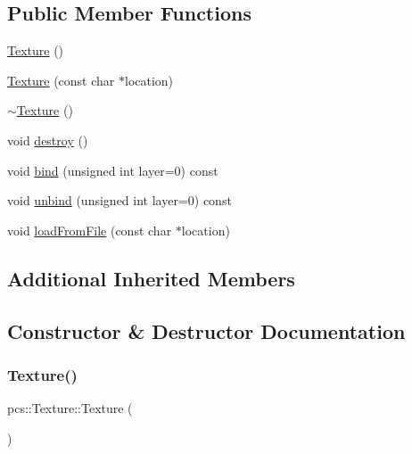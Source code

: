 \subsection*{Public Member Functions}
\begin{DoxyCompactItemize}
\item 
\hyperlink{classpcs_1_1Texture_a1f0e7c4ed23cf395b082cc5cc56497a4}{Texture} ()
\item 
\hyperlink{classpcs_1_1Texture_a7d85ec721e688ee7313bd858477fbcf2}{Texture} (const char $\ast$location)
\item 
\hyperlink{classpcs_1_1Texture_a2267bb7d920e784a1915ae14e5b5916b}{$\sim$\+Texture} ()
\item 
void \hyperlink{classpcs_1_1Texture_aad31d75ae69be153300bd87e244afa54}{destroy} ()
\item 
void \hyperlink{classpcs_1_1Texture_a7c9becc6a694a55489bdc2b62c4aea2a}{bind} (unsigned int layer=0) const
\item 
void \hyperlink{classpcs_1_1Texture_ab2a0dfd6196bd6f5608e59ca2bd9df1a}{unbind} (unsigned int layer=0) const
\item 
void \hyperlink{classpcs_1_1Texture_a7cedaff72d12b58ace397f7ef4de23f3}{load\+From\+File} (const char $\ast$location)
\end{DoxyCompactItemize}
\subsection*{Additional Inherited Members}


\subsection{Constructor \& Destructor Documentation}
\mbox{\label{classpcs_1_1Texture_a1f0e7c4ed23cf395b082cc5cc56497a4}} 
\subsubsection{\texorpdfstring{Texture()}{Texture()}\hspace{0.1cm}{\footnotesize\ttfamily [1/2]}}
{\footnotesize\ttfamily pcs\+::\+Texture\+::\+Texture (\begin{DoxyParamCaption}{ }\end{DoxyParamCaption})}

\mbox{\label{classpcs_1_1Texture_a7d85ec721e688ee7313bd858477fbcf2}} 
